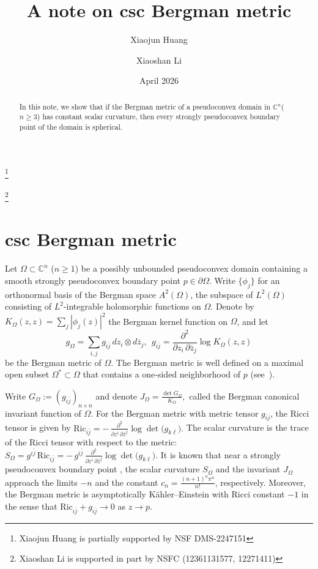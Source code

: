 \documentclass[a4paper,centertags,osxzneside,12pt]{amsart}
\numberwithin{equation}{section}
\begin{document}
\title{A note on csc Bergman metric}
\author{Xiaojun Huang}
\address{Department of Mathematics, Rutgers University, New Brunswick, NJ 08903, USA.}
\thanks{Xiaojun Huang is partially supported  by NSF DMS-2247151}


\author{Xiaoshan Li}
\address{School of Mathematics and Statistics, Wuhan University, Wuhan, Hubei 430072, China.}
\thanks{Xiaoshan Li is supported in part by NSFC (12361131577, 12271411)}
\date{April 2026}
\begin{abstract}
    In this note, we show that if the Bergman metric of a pseudoconvex domain in $\mathbb C^n$($n\geq 3$) has constant scalar curvature, then every strongly pseudoconvex boundary point of the domain is spherical.
\end{abstract}
\maketitle
\section{csc Bergman metric}





Let $\Omega\subset\mathbb C^n$ ($n\geq 1$) be a possibly unbounded pseudoconvex domain containing a smooth strongly pseudoconvex boundary point $p\in\partial\Omega$. Write $\{\phi_j\}$ for an orthonormal basis of the Bergman space $A^2(\Omega)$, the subspace of $L^2(\Omega)$ consisting of $L^2$-integrable holomorphic functions on $\Omega$. Denote by
$
K_{\Omega}(z, z)=\sum_{j}|\phi_j(z)|^2
$
the Bergman kernel function on $\Omega$, and let
\[
g_{\Omega}=\sum_{i,j}g_{i\overline j}\,dz_i\otimes d\overline z_j, \ \ g_{i\overline j}=\frac{\partial^2}{\partial z_i\,\partial \overline z_j}\log K_{\Omega}(z,z)
\]
be the  Bergman metric of $\Omega$. The Bergman metric is well defined on a maximal open subset $\Omega^*\subset \Omega$ that contains a one‑sided neighborhood of $p$ (see~\cite{HJL25}). 

Write $G_{\Omega}:=(g_{i\overline j})_{n\times n}$ and denote
$
J_{\Omega}=\frac{\det G_{\Omega}}{K_{\Omega}},
$ 
called the Bergman canonical invariant function of $\Omega$. 
For the Bergman metric with metric tensor \( g_{i\bar{j}} \), the Ricci tensor is given by
$ 
\mathrm{Ric}_{i\bar{j}}
=
-\,\frac{\partial^2}{\partial z^i \,\partial \bar{z}^j}
\log \det\bigl(g_{k\bar{\ell}}\bigr).
$ 
The scalar curvature is the trace of the Ricci tensor with respect to the metric:
$ 
S_{\Omega}=g^{i\bar{j}} \,\mathrm{Ric}_{i\bar{j}}=
-\,g^{i\bar{j}} \,\frac{\partial^2}{\partial z^i \,\partial \bar{z}^j}
\log \det\bigl(g_{k\bar{\ell}}\bigr).
$ 
It is known that near a strongly pseudoconvex boundary point \cite{KYu96}, the scalar curvature \( S_{\Omega} \) and the invariant \( J_\Omega \) approach the limits \( -n \) and the constant \( c_n=\frac{(n+1)^n\pi^n}{n!} \), respectively. Moreover, the Bergman metric is asymptotically K\"ahler--Einstein with Ricci constant \( -1 \) in the sense that $\mathrm{Ric}_{i\bar{j}}+g_{i\bar{j}}\rightarrow 0$ as $z\rightarrow p$.
\end{document}
